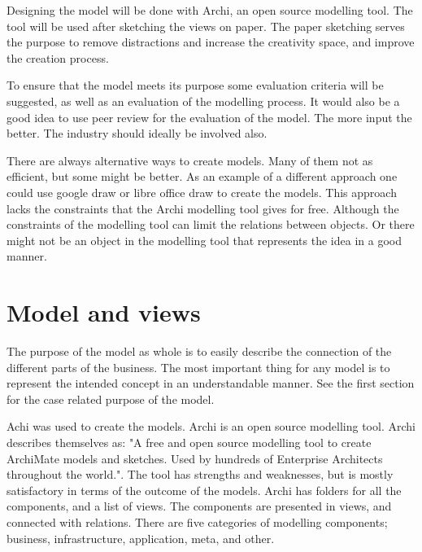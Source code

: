 \documentclass[12pt, a4paper]{article}
\begin{document}
Designing the model will be done with Archi, an open source modelling tool. The
tool will be used after sketching the views on paper. The paper sketching
serves the purpose to remove distractions and increase the creativity space,
and improve the creation process. 

To ensure that the model meets its purpose some evaluation criteria will be
suggested, as well as an evaluation of the modelling process. It would also be
a good idea to use peer review for the evaluation of the model. The more input
the better. The industry should ideally be involved also. 

There are always alternative ways to create models. Many of them not as
efficient, but some might be better. As an example of a different approach one
could use google draw or libre office draw to create the models. This approach
lacks the constraints that the Archi modelling tool gives for free. Although
the constraints of the modelling tool can limit the relations between objects.
Or there might not be an object in the modelling tool that represents the idea
in a good manner.  

\section{Model and views}


The purpose of the model as whole is to easily describe the connection of the
different parts of the business. The most important thing for any model is to
represent the intended concept in an understandable manner. See the first
section for the case related purpose of the model.

Achi was used to create the models. Archi is an open source modelling tool. 
Archi describes themselves as: "A free and open source modelling tool to create
ArchiMate models and sketches. Used by hundreds of Enterprise Architects
throughout the world.". The tool has strengths and weaknesses, but is mostly
satisfactory in terms of the outcome of the models.
Archi has folders for all the components, and a list of views. The components
are presented in views, and connected with relations. There are five categories
of modelling components; business, infrastructure, application, meta, and
other. 
\end{document}
